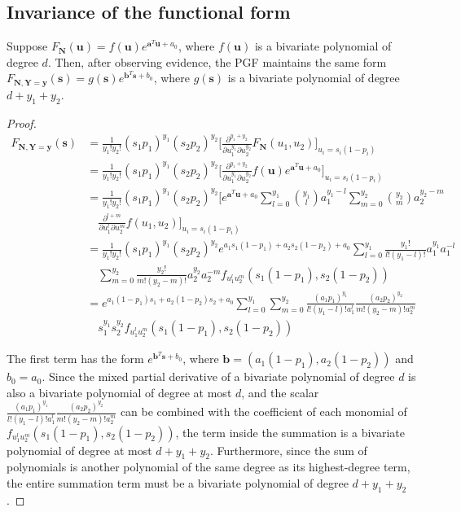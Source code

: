 \documentclass{article}
\begin{document}
\subsection{Invariance of the functional form}
Suppose $F_\mathbf{N}(\mathbf{u}) = f(\mathbf{u}) e^{\mathbf{a}^T \mathbf{u} + a_0}$, where $f(\mathbf{u})$ is a bivariate polynomial of degree $d$. Then, after observing evidence, the PGF maintains the same form $F_{\mathbf{N}, \mathbf{Y} = \mathbf{y}}(\mathbf{s}) = g(\mathbf{s}) e^{\mathbf{b}^T \mathbf{s} + b_0}$, where $g(\mathbf{s})$ is a bivariate polynomial of degree $d + y_1 + y_2$.

\begin{proof}

\begin{align*}
F_{\mathbf{N}, \mathbf{Y} = \mathbf{y}}(\mathbf{s})
&= \frac{1}{y_1!y_2!} (s_1p_1)^{y_1} (s_2p_2)^{y_2} \bigg[ \frac{\partial^{y_1+y_2}}{\partial u_1^{y_1} \partial u_2^{y_2}} F_{\mathbf{N}}(u_1, u_2) \bigg]_{u_i = s_i(1-p_i)} \\
&= \frac{1}{y_1!y_2!} (s_1p_1)^{y_1} (s_2p_2)^{y_2} \bigg[ \frac{\partial^{y_1+y_2}}{\partial u_1^{y_1} \partial u_2^{y_2}} f(\mathbf{u}) e^{\mathbf{a}^T \mathbf{u} + a_0} \bigg]_{u_i = s_i(1-p_i)} \\
&= \frac{1}{y_1!y_2!} (s_1p_1)^{y_1} (s_2p_2)^{y_2} \bigg[ e^{\mathbf{a}^T \mathbf{u} + a_0} \sum_{l=0}^{y_1} {y_1 \choose l} a_1^{y_1 - l} \sum_{m=0}^{y_2} {y_2 \choose m} a_2^{y_2 - m} \\
& \quad \frac{\partial^{l+m}}{\partial u_1^{l} \partial u_2^{m}} f(u_1, u_2) \bigg]_{u_i = s_i(1-p_i)} \\
&= \frac{1}{y_1! y_2!} (s_1 p_1)^{y_1} (s_2 p_2)^{y_2} e^{a_1 s_1 (1-p_1) + a_2 s_2 (1-p_2) + a_0} \sum_{l=0}^{y_1} \frac{y_1!}{l! (y_1 - l)!} a_1^{y_1} a_1^{- l} \\
& \quad \sum_{m=0}^{y_2} \frac{y_2!}{m! (y_2 - m)!} a_2^{y_2} a_2^{- m} f_{u_1^l u_2^m}(s_1(1-p_1), s_2(1-p_2))  \\
&= e^{a_1(1-p_1)s_1 + a_2(1-p_2)s_2 + a_0} \sum_{l=0}^{y_1} \sum_{m=0}^{y_2} \frac{(a_1p_1)^{y_1}}{l! (y_1 - l)! a_1^{ l}} \frac{(a_2p_2)^{y_2}}{m!(y_2 - m)! a_2^{m}} \\
& \quad s_1^{y_1} s_2^{y_2} f_{u_1^l u_2^m}(s_1(1-p_1), s_2(1-p_2))
\end{align*}

The first term has the form $e^{\mathbf{b}^T \mathbf{s} + b_0}$, where $\mathbf{b} = (a_1(1-p_1), a_2(1-p_2))$ and $b_0 = a_0$. Since the mixed partial derivative of a bivariate polynomial of degree $d$ is also a bivariate polynomial of degree at most $d$, and the scalar $\frac{(a_1p_1)^{y_1}}{l! (y_1 - l)! a_1^{ l}} \frac{(a_2p_2)^{y_2}}{m!(y_2 - m)! a_2^{m}}$ can be combined with the coefficient of each monomial of $f_{u_1^l u_2^m}(s_1(1-p_1), s_2(1-p_2))$, the term inside the summation is a bivariate polynomial of degree at most $d + y_1 + y_2$. Furthermore, since the sum of polynomials is another polynomial of the same degree as its highest-degree term, the entire summation term must be a bivariate polynomial of degree $d + y_1 + y_2$.

\end{proof}
\end{document}
